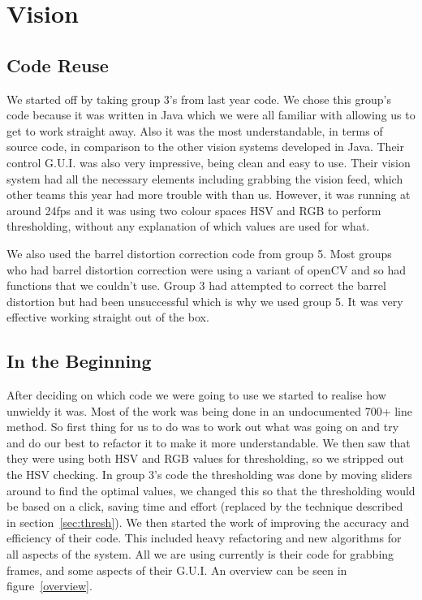 \section{Vision}

\subsection{Code Reuse}

We started off by taking group 3's from last year code.  We chose this group's code because it was written in Java which we were all familiar with allowing us to get to work straight away. Also it was the most understandable, in terms of source code, in comparison to the other vision systems developed in Java.  Their control G.U.I. was also very impressive, being clean and easy to use.  Their vision system had all the necessary elements including grabbing the vision feed, which other teams this year had more trouble with than us.  However, it was running at around 24fps and it was using two colour spaces HSV and RGB to perform thresholding, without any explanation of which values are used for what. 

We also used the barrel distortion correction code from group 5.  Most groups who had barrel distortion correction were using a variant of openCV and so had functions that we couldn't use.  Group 3 had attempted to correct the barrel distortion but had been unsuccessful which is why we used group 5.  It was very effective working straight out of the box.

\subsection{In the Beginning}

After deciding on which code we were going to use we started to realise how unwieldy it was.  Most of the work was being done in an undocumented 700+ line method.  So first thing for us to do was to work out what was going on and try and do our best to refactor it to make it more understandable.  We then saw that they were using both HSV and RGB values for thresholding, so we stripped out the HSV checking.  In group 3's code the thresholding was done by moving sliders around to find the optimal values, we changed this so that the thresholding would be based on a click, saving time and effort (replaced by the technique described in section~\ref{sec:thresh}).  We then started the work of improving the accuracy and efficiency of their code.  This included heavy refactoring and new algorithms for all aspects of the system.  All we are using currently is their code for grabbing frames, and some aspects of their G.U.I. An overview can be seen in figure~\ref{overview}.


